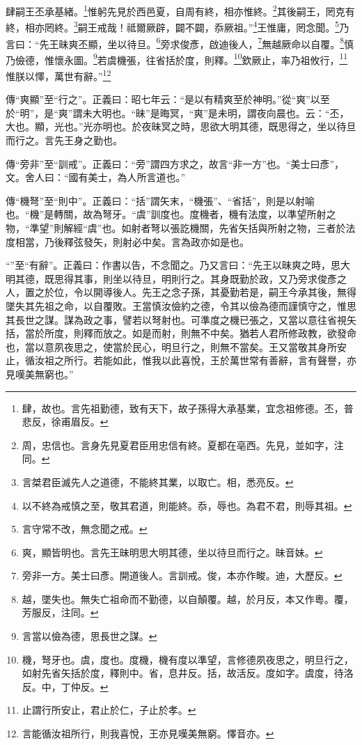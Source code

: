 肆嗣王丕承基緒。\footnote{肆，故也。言先祖勤德，致有天下，故子孫得大承基業，宜念祖修德。丕，普悲反，徐甫眉反。}惟躬先見於西邑夏，自周有終，相亦惟終。\footnote{周，忠信也。言身先見夏君臣用忠信有終。夏都在亳西。先見，並如字，注同。}其後嗣王，罔克有終，相亦罔終。\footnote{言桀君臣滅先人之道德，不能終其業，以取亡。相，悉亮反。}嗣王戒哉！祗爾厥辟，闢不闢，忝厥祖。”\footnote{以不終為戒慎之至，敬其君道，則能終。忝，辱也。為君不君，則辱其祖。}王惟庸，罔念聞。\footnote{言守常不改，無念聞之戒。}乃言曰：“先王昧爽丕顯，坐以待旦。\footnote{爽，顯皆明也。言先王昧明思大明其德，坐以待旦而行之。昧音妹。}旁求俊彥，啟迪後人，\footnote{旁非一方。美士曰彥。開道後人。言訓戒。俊，本亦作畯。迪，大歷反。}無越厥命以自覆。\footnote{越，墜失也。無失亡祖命而不勤德，以自顛覆。越，於月反，本又作粵。覆，芳服反，注同。}慎乃儉德，惟懷永圖。\footnote{言當以儉為德，思長世之謀。}若虞機張，往省括於度，則釋。\footnote{機，弩牙也。虞，度也。度機，機有度以準望，言修德夙夜思之，明旦行之，如射先省矢括於度，釋則中。省，息井反。括，故活反。度如字。虞度，待洛反。中，丁仲反。}欽厥止，率乃祖攸行，\footnote{止謂行所安止，君止於仁，子止於孝。}惟朕以懌，萬世有辭。”\footnote{言能循汝祖所行，則我喜悅，王亦見嘆美無窮。懌音亦。}

{\noindent\zhuan{}\fzbyks 傳“爽顯”至“行之”。正義曰：昭七年云：“是以有精爽至於神明。”從“爽”以至於“明”，是“爽”謂未大明也。“昧”是晦冥，“爽”是未明，謂夜向晨也。云：“丕，大也。顯，光也。”光亦明也。於夜昧冥之時，思欲大明其德，既思得之，坐以待旦而行之。言先王身之勤也。 \par}

{\noindent\zhuan{}\fzbyks 傳“旁非”至“訓戒”。正義曰：“旁”謂四方求之，故言“非一方”也。“美士曰彥”，文。舍人曰：“國有美士，為人所言道也。” \par}

{\noindent\zhuan{}\fzbyks 傳“機弩”至“則中”。正義曰：“括”謂矢末，“機張”、“省括”，則是以射喻也。“機”是轉關，故為弩牙。“虞”訓度也。度機者，機有法度，以準望所射之物，“準望”則解經“虞”也。如射者弩以張訖機關，先省矢括與所射之物，三者於法度相當，乃後釋弦發矢，則射必中矣。言為政亦如是也。 \par}

{\noindent\shu{}\fzkt “”至“有辭”。正義曰：作書以告，不念聞之。乃又言曰：“先王以昧爽之時，思大明其德，既思得其事，則坐以待旦，明則行之。其身既勤於政，又乃旁求俊彥之人，置之於位，令以開導後人。先王之念子孫，其憂勤若是，嗣王今承其後，無得墜失其先祖之命，以自覆敗。王當慎汝儉約之德，令其以儉為德而謹慎守之，惟思其長世之謀。謀為政之事，譬若以弩射也。可準度之機已張之，又當以意往省視矢括，當於所度，則釋而放之。如是而射，則無不中矣。猶若人君所修政教，欲發命也，當以意夙夜思之，使當於民心，明旦行之，則無不當矣。王又當敬其身所安止，循汝祖之所行。若能如此，惟我以此喜悅，王於萬世常有善辭，言有聲譽，亦見嘆美無窮也。” \par}

